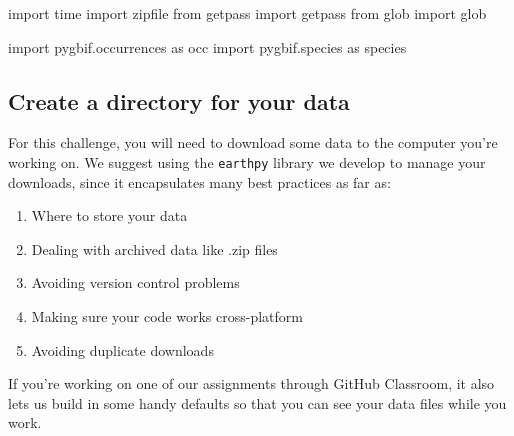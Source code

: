 \documentclass[
  letterpaper,
  DIV=11,
  numbers=noendperiod,
  oneside]{scrreprt}
\newenvironment{Shaded}{\begin{snugshade}}{\end{snugshade}}
\newcommand{\ImportTok}[1]{\textcolor[rgb]{0.00,0.46,0.62}{#1}}
\newcommand{\NormalTok}[1]{\textcolor[rgb]{0.00,0.23,0.31}{#1}}
\providecommand{\tightlist}{%
  \setlength{\itemsep}{0pt}\setlength{\parskip}{0pt}}
\begin{document}
\begin{Shaded}
\begin{Highlighting}[]
\ImportTok{import}\NormalTok{ time}
\ImportTok{import}\NormalTok{ zipfile}
\ImportTok{from}\NormalTok{ getpass }\ImportTok{import}\NormalTok{ getpass}
\ImportTok{from}\NormalTok{ glob }\ImportTok{import}\NormalTok{ glob}

\ImportTok{import}\NormalTok{ pygbif.occurrences }\ImportTok{as}\NormalTok{ occ}
\ImportTok{import}\NormalTok{ pygbif.species }\ImportTok{as}\NormalTok{ species}
\end{Highlighting}
\end{Shaded}

\subsection{Create a directory for your
data}\label{create-a-directory-for-your-data-1}

For this challenge, you will need to download some data to the computer
you're working on. We suggest using the \texttt{earthpy} library we
develop to manage your downloads, since it encapsulates many best
practices as far as:

\begin{enumerate}
\def\labelenumi{\arabic{enumi}.}
\tightlist
\item
  Where to store your data
\item
  Dealing with archived data like .zip files
\item
  Avoiding version control problems
\item
  Making sure your code works cross-platform
\item
  Avoiding duplicate downloads
\end{enumerate}

If you're working on one of our assignments through GitHub Classroom, it
also lets us build in some handy defaults so that you can see your data
files while you work.
\end{document}
